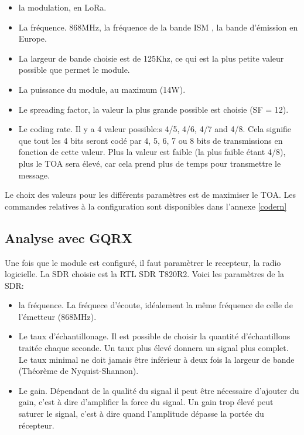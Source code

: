 \vspace{0.1cm}

\begin{itemize}
\item la modulation, en LoRa.
\item La fréquence. 868MHz, la fréquence de la bande ISM , la bande d'émission en Europe.
\item La largeur de bande choisie est de 125Khz, ce qui est la plus petite valeur possible que permet le module.
\item La puissance du module, au maximum (14W).
\item Le spreading factor, la valeur la plus grande possible est choisie (SF = 12).
\item Le coding rate. Il y a 4 valeur possible:s 4/5, 4/6, 4/7 and 4/8. Cela signifie que tout les 4 bits seront codé par 4, 5, 6, 7 ou 8 bits de transmissions en fonction de cette valeur. Plus la valeur est faible (la plus faible étant 4/8), plus le TOA sera élevé, car cela prend plus de temps pour transmettre le message.
\end{itemize}

\vspace{0.1cm}

Le choix des valeurs pour les différents paramètres est de maximiser le TOA. Les commandes relatives à la configuration sont disponibles dans l'annexe \ref{codern}

\subsection{Analyse avec GQRX}

Une fois que le module est configuré, il faut paramètrer le recepteur, la radio logicielle. La SDR choisie est la RTL SDR T820R2. Voici les paramètres de la SDR:

\vspace{0.1cm}

\begin{itemize}
\item la fréquence. La fréquece d'écoute, idéalement la même fréquence de celle de l'émetteur (868MHz).
\item Le taux d'échantillonage. Il est possible de choisir la quantité d'échantillons traitée chaque seconde. Un taux plus élevé donnera un signal plus complet. Le taux minimal ne doit jamais être inférieur à deux fois la largeur de bande (Théorème de Nyquist-Shannon).
\item Le gain. Dépendant de la qualité du signal il peut être nécessaire d'ajouter du gain, c'est à dire d'amplifier la force du signal. Un gain trop élevé peut saturer le signal, c'est à dire quand l'amplitude dépasse la portée du récepteur.
\end{itemize}

